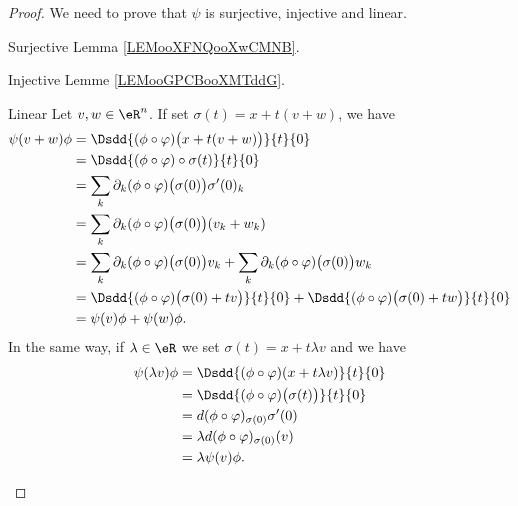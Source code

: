 \begin{proof}
    We need to prove that \( \psi\) is surjective, injective and linear.
    \begin{subproof}
    \item[Surjective] Lemma \ref{LEMooXFNQooXwCMNB}.
    \item[Injective] Lemme \ref{LEMooGPCBooXMTddG}.
    \item[Linear]
        Let \( v,w\in \eR^n\). If set \( \sigma(t)=x+t(v+w)\), we have
        \begin{subequations}
            \begin{align}
                \psi(v+w)\phi&=\Dsdd{ (\phi\circ \varphi)\big( x+t(v+w) \big) }{t}{0}\\
                &=\Dsdd{ (\phi\circ \varphi)\circ \sigma(t) }{t}{0}\\
                &=\sum_k\partial_k(\phi\circ\varphi)\big( \sigma(0) \big)\sigma'(0)_k\\
                &=\sum_k\partial_k(\phi\circ\varphi)\big( \sigma(0) \big)(v_k+w_k)\\
                &=\sum_k\partial_k(\phi\circ\varphi)\big( \sigma(0) \big)v_k+\sum_k\partial_k(\phi\circ\varphi)\big( \sigma(0) \big)w_k\\
                &=\Dsdd{ (\phi\circ\varphi)\big( \sigma(0)+tv \big) }{t}{0}+\Dsdd{ (\phi\circ\varphi)\big( \sigma(0)+tw \big) }{t}{0}\\
                &=\psi(v)\phi+\psi(w)\phi.
            \end{align}
        \end{subequations}
        In the same way, if \( \lambda\in \eR\) we set \( \sigma(t)=x+t\lambda v\) and we have
        \begin{subequations}
            \begin{align}
                \psi(\lambda v)\phi&=\Dsdd{ (\phi\circ\varphi)(x+t\lambda v) }{t}{0}\\
                &=\Dsdd{ (\phi\circ\varphi)\big( \sigma(t) \big) }{t}{0}\\
                &=d(\phi\circ\varphi)_{\sigma(0)}\sigma'(0)\\
                &=\lambda d(\phi\circ\varphi)_{\sigma(0)}(v)\\
                &=\lambda\psi(v)\phi.
            \end{align}
        \end{subequations}
    \end{subproof}
\end{proof}

